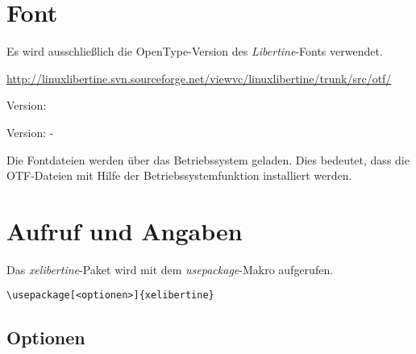 \documentclass{fontdoku}
\begin{document}
\section{Font}

Es wird ausschließlich die OpenType-Version des \emph{Libertine}-Fonts verwendet.




\begin{description}
\item[Font] \url{http://linuxlibertine.svn.sourceforge.net/viewvc/linuxlibertine/trunk/src/otf/}
\item[\XeTeX] Version: \the\XeTeXversion\XeTeXrevision
\item[xelibertine] Version: \libertineVersionDate\space-\space\libertineVersion
\end{description}


Die Fontdateien werden über das Betriebssystem geladen. Dies bedeutet, dass die OTF-Dateien mit Hilfe der Betriebssystemfunktion installiert werden.

\section{Aufruf und Angaben}

Das \emph{xelibertine}-Paket wird mit dem \emph{usepackage}-Makro aufgerufen.

\begin{lstlisting}
\usepackage[<optionen>]{xelibertine}
\end{lstlisting}

\subsection{Optionen}
\end{document}
